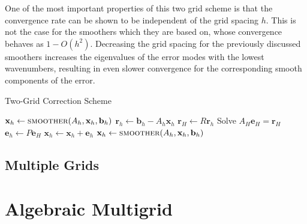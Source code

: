 One of the most important properties of this two grid scheme is that the convergence rate can be shown to be independent of the grid spacing $h$. This is not the case for the smoothers which they are based on, whose convergence behaves as $1 - O(h^2)$. Decreasing the grid spacing for the previously discussed smoothers increases the eigenvalues of the error modes with the lowest wavenumbers, resulting in even slower convergence for the corresponding smooth components of the error.

\begin{algorithm}
	\caption{Two-Grid Correction Scheme}\label{alg:two_grid}
	\begin{algorithmic}[1]
			\State $\mathbf{x}_h \gets \Call{smoother}{A_h, \mathbf{x}_h, \mathbf{b}_h}$ 
		\EndFor
		\State $\mathbf{r}_h \gets \mathbf{b}_h - A_h \mathbf{x}_h$ 
		\State $\mathbf{r}_H \gets R \mathbf{r}_h$ 
		\State Solve $A_H \mathbf{e}_H = \mathbf{r}_H$ 
		\State $\mathbf{e}_h \gets P \mathbf{e}_H$ 
		\State $\mathbf{x}_h \gets \mathbf{x}_h + \mathbf{e}_h$ 
			\State $\mathbf{x}_h \gets \Call{smoother}{A_h, \mathbf{x}_h, \mathbf{b}_h}$ 
		\EndFor
		\EndProcedure
	\end{algorithmic}
\end{algorithm}

\subsection{Multiple Grids}


\section{Algebraic Multigrid}


